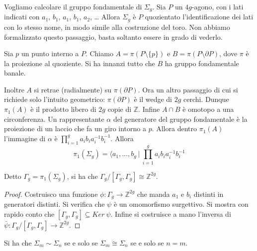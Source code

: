 \begin{ex}
    Vogliamo calcolare il gruppo fondamentale di $\Sigma_g$. Sia $P$ un $4g$-agono, con i lati indicati con $a_1$, $b_1$, $a_1$, $b_1$, $a_2$, \dots
    Allora $\Sigma_g$ \`e $P$ quozientato l'identificazione dei lati con lo stesso nome, in modo simile alla costruzione del toro. Non abbiamo formalizzato questo passaggio, basta soltanto essere in grado di vederlo.

    Sia $p$ un punto interno a $P$. Chiamo $A = \pi(P\setminus\{p\})$ e $B=\pi(P\setminus\partial P)$, dove $\pi$ \`e la proiezione al quoziente.  Si ha innanzi tutto che $B$ ha gruppo fondamentale banale.

    Inoltre $A$ si retrae (radialmente) su $\pi(\partial P)$. Ora un altro passaggio di cui si richiede solo l'intuito geometrico: $\pi(\partial P)$ \`e il wedge di $2g$ cerchi. Dunque $\pi_1(A)$ \`e il prodotto libero di $2g$ copie di $\mathbb{Z}$. Infine $A\cap B$ \`e omotopo a una circonferenza. Un rappresentante $\alpha$ del generatore del gruppo fondamentale \`e la proiezione di un laccio che fa un giro intorno a $p$.
    Allora dentro $\pi_1(A)$ l'immagine di $\alpha$ \`e $\prod_{i=1}^g a_ib_ia_i^{-1}b_i^{-1}$.
    Allora
    \[
        \pi_1(\Sigma_g)=\langle a_1, \dots, b_g\ |\ \prod_{i=1}^ga_ib_ia_i^{-1}b_i^{-1}
    \]
\end{ex}
\begin{prop}
    Detto $\Gamma_g = \pi_1(\Sigma_g)$, si ha che $\Gamma_g /[\Gamma_g, \Gamma_g] \cong \mathbb{Z}^{2g}$.
\end{prop}
\begin{proof}
    Costruisco una funzione $\phi\colon \Gamma_g\longrightarrow \mathbb{Z}^{2g}$ che manda $a_1$ e $b_i$ distinti in generatori distinti. Si verifica che $\psi$ \`e un omomorfismo surgettivo. Si mostra con rapido conto che $[\Gamma_g, \Gamma_g]\subseteq Ker\ \psi$. Infine si costruisce a mano l'inversa di $\bar{\psi}\colon \Gamma_g /[\Gamma_g, \Gamma_g]\rightarrow \mathbb{Z}^{2g}$.
\end{proof}

\begin{cor}
    Si ha che $\Sigma_m \sim \Sigma_n$ se e solo se $\Sigma_m \cong \Sigma_n$ se e solo se $n=m$.
\end{cor}
